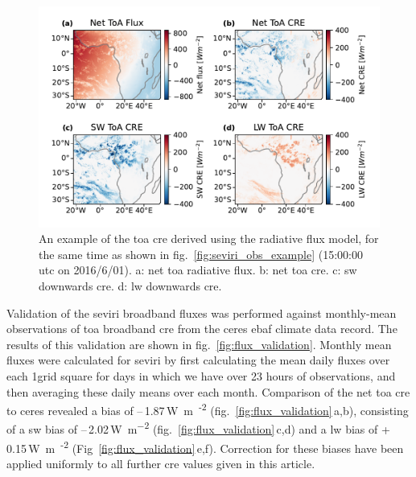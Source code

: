 \documentclass[acp, manuscript]{copernicus}
\begin{document}
\begin{figure}[tp]
    \includegraphics[width=12cm]{figures/fig02.pdf}
    \caption[
    An example of the \acrshort{toa} \acrshort{cre} derived using the radiative flux model
    ]{
    An example of the \acrshort{toa} \acrshort{cre} derived using the radiative flux model, for the same time
    as shown in fig.~\ref{fig:seviri_obs_example} (15:00:00 \acrshort{utc} on 2016/6/01). a: net \acrshort{toa} radiative flux. b: net \acrshort{toa} \acrshort{cre}. c: \acrshort{sw} downwards \acrshort{cre}. d: \acrshort{lw} downwards \acrshort{cre}.
    }
    \label{fig:seviri_flux_example}
\end{figure}


Validation of the \acrshort{seviri} broadband fluxes was performed against monthly-mean observations of \acrshort{toa} broadband \acrshort{cre} from the \acrfull{ceres} \citep{loeb_clouds_2018} \acrfull{ebaf} climate data record. 
The results of this validation are shown in fig.~\ref{fig:flux_validation}. 
Monthly mean fluxes were calculated for \acrshort{seviri} by first calculating the mean daily fluxes over each 1\textdegree grid square for days in which we have over 23 hours of observations, and then averaging these daily means over each month. 
Comparison of the net \acrshort{toa} \acrshort{cre} to \acrshort{ceres} revealed a bias of --\,1.87\,\unit{W m\textsuperscript{-2}} (fig.~\ref{fig:flux_validation}\,a,b), consisting of a \acrshort{sw} bias of --\,2.02\,\unit{W m^{-2}} (fig.~\ref{fig:flux_validation}\,c,d) and a \acrshort{lw} bias of +\,0.15\,\unit{W m\textsuperscript{-2}} (Fig~\ref{fig:flux_validation}\,e,f). 
Correction for these biases have been applied uniformly to all further \acrshort{cre} values given in this article.
\end{document}
